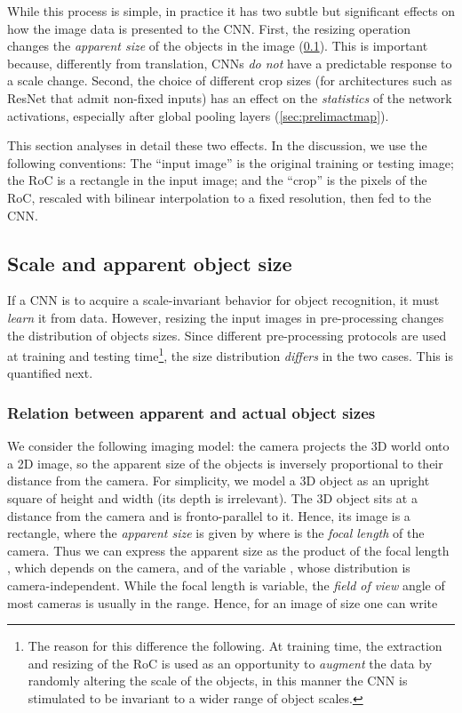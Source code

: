 \documentclass{article}
\begin{document}
While this process is simple, in practice it has two subtle but significant effects on how the image data is presented to the CNN{}.
First, the resizing operation changes the \emph{apparent size} of the objects in the image (\cref{sec:apparent}).
This is important because, differently from translation, CNNs \emph{do not} have a predictable response to a scale change.
Second, the choice of different crop sizes (for architectures such as ResNet that admit non-fixed inputs) has an effect on the \emph{statistics} of the network activations, especially after global pooling layers (\cref{sec:prelimactmap}).

This section analyses in detail these two effects.
In the discussion, we use the following conventions:
The ``input image'' is the original training or testing image;
the RoC is a rectangle in the input image;
and the ``crop'' is the pixels of the RoC, rescaled with bilinear interpolation to a fixed resolution, then fed to the CNN{}.

\subsection{Scale and apparent object size}\label{sec:apparent}

If a CNN is to acquire a scale-invariant behavior for object recognition, it must \emph{learn} it from data.
However, resizing the input images in pre-processing changes the  distribution of objects sizes.
Since different pre-processing protocols are used at training and testing time\footnote{
The reason for this difference the following.
At training time, the extraction and resizing of the RoC is used as an opportunity to \emph{augment} the data by randomly altering the scale of the objects,
in this manner the CNN is stimulated to be invariant to a wider range of object scales.
},
the size distribution \emph{differs} in the two cases.
This is quantified next.

\subsubsection{Relation between apparent and actual object sizes}

We consider the following imaging model: the camera projects the 3D world onto a 2D image, so the apparent size of the objects is inversely proportional to their distance from the camera.
For simplicity, we model a 3D object as an upright square of height and width  (its depth is irrelevant).
The 3D object sits at a distance  from the camera and is fronto-parallel to it.
Hence, its image is a  rectangle, where the \emph{apparent size}  is given by  where  is the \emph{focal length} of the camera.
Thus we can express the apparent size as the product  of the focal length , which depends on the camera, and of the variable , whose distribution  is camera-independent.
While the focal length is variable, the \emph{field of view} angle  of most cameras is usually in the  range.
Hence, for an image of size  one can write  
\end{document}
